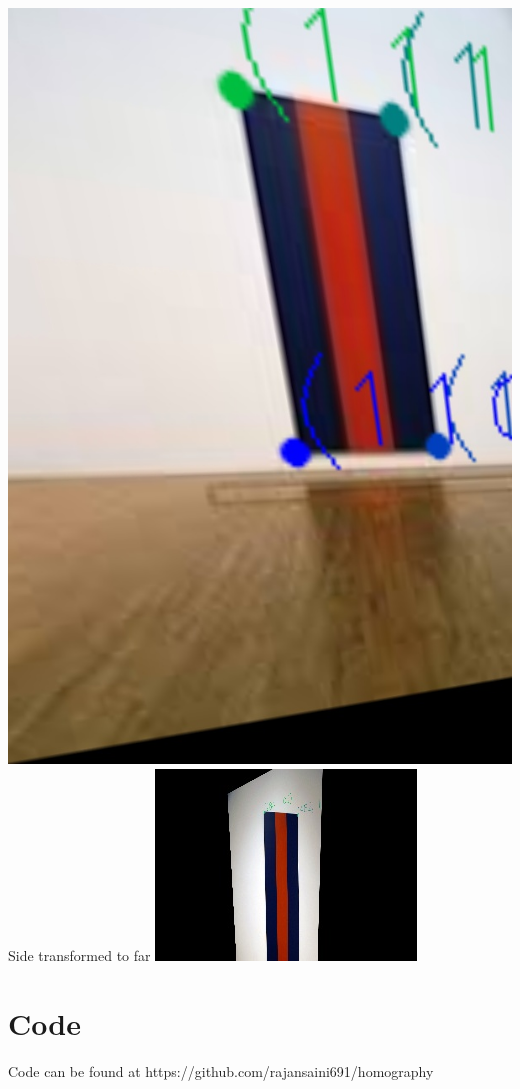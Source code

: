 \documentclass{article}
\begin{document}
\includegraphics[width=\linewidth]{./results/voices_of_fire/far_transformed.jpg}
Side transformed to far
\includegraphics[width=\linewidth]{./results/voices_of_fire/side_transformed.jpg}

\section{Code}
Code can be found at https://github.com/rajansaini691/homography
\end{document}
